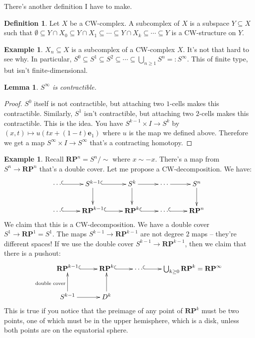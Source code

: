 \documentclass{amsart}
\theoremstyle{theorem}
\newtheorem{lemma}[theorem]{Lemma}
\theoremstyle{definition}
\newtheorem{definition}[theorem]{Definition}
\newtheorem{example}[theorem]{Example}
\begin{document}
There's another definition I have to make.
\begin{definition}
Let $X$ be a CW-complex. A subcomplex of $X$ is a subspace $Y\subseteq X$ such that $\emptyset\subseteq Y\cap X_0\subseteq Y\cap X_1\subseteq\cdots\subseteq Y\cap X_k\subseteq \cdots\subseteq Y$ is a CW-structure on $Y$.
\end{definition}
\begin{example}
$X_n\subseteq X$ is a subcomplex of a CW-complex $X$. It's not that hard to see why. In particular, $S^0\subseteq S^1\subseteq S^2\subseteq\cdots\subseteq \bigcup_{n\geq 1}S^n=:S^\infty$. This of finite type, but isn't finite-dimensional.
\end{example}
\begin{lemma}
$S^\infty$ is contractible.
\end{lemma}
\begin{proof}
$S^0$ itself is not contractible, but attaching two $1$-cells makes this contractible. Similarly, $S^1$ isn't contractible, but attaching two $2$-cells makes this contractible. This is the idea. You have $S^{k-1}\times I\to S^k$ by $(x,t)\mapsto u(tx+(1-t)\mathbf{e}_1)$ where $u$ is the map we defined above. Therefore we get a map $S^\infty\times I\to S^\infty$ that's a contracting homotopy.
\end{proof}
\begin{example}
Recall $\mathbf{RP}^n=S^n/\sim$ where $x\sim -x$. There's a map from $S^n\to\mathbf{RP}^n$ that's a double cover. Let me propose a CW-decomposition. We have:
\begin{equation*}
\xymatrix{\cdots\ar@{^(->}[r] & S^{k-1}\ar@{^(->}[r]\ar[d] & S^k\ar[d]\ar[r] & \cdots\ar[r] & S^n\ar[d]\\
\cdots\ar@{^(->}[r] & \mathbf{RP}^{k-1}\ar@{^(->}[r] & \mathbf{RP}^k\ar@{^(->}[r] & \cdots\ar@{^(->}[r] & \mathbf{RP}^n}
\end{equation*}
We claim that this is a CW-decomposition. We have a double cover $S^1\to\mathbf{RP}^1=S^1$. The maps $S^{k-1}\to\mathbf{RP}^{k-1}$ are not degree $2$ maps -- they're different spaces! If we use the double cover $S^{k-1}\to\mathbf{RP}^{k-1}$, then we claim that there is a pushout:
\begin{equation*}
\xymatrix{\mathbf{RP}^{k-1}\ar@{^(->}[r]& \mathbf{RP}^k\ar@{^(->}[r] & \cdots\ar@{^(->}[r] & \bigcup_{k\geq 0}\mathbf{RP}^k=\mathbf{RP}^\infty\\
S^{k-1}\ar[u]^{\text{double cover}}\ar[r] & D^k\ar[u]}
\end{equation*}
This is true if you notice that the preimage of any point of $\mathbf{RP}^k$ must be two points, one of which must be in the upper hemisphere, which is a disk, unless both points are on the equatorial sphere.
\end{example}
\end{document}

